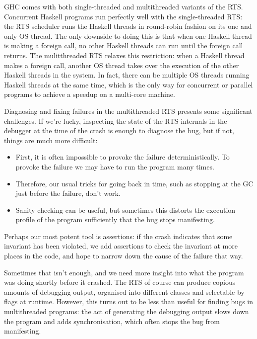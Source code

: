 \documentclass{article}
\begin{document}
GHC comes with both single-threaded and multithreaded variants of the
RTS.  Concurrent Haskell programs run perfectly well with the
single-threaded RTS: the RTS scheduler runs the Haskell threads in
round-robin fashion on its one and only OS thread.  The only downside
to doing this is that when one Haskell thread is making a foreign
call, no other Haskell threads can run until the foreign call returns.
The mulitthreaded RTS relaxes this restriction: when a Haskell thread
makes a foreign call, another OS thread takes over the execution of
the other Haskell threads in the system.  In fact, there can be
multiple OS threads running Haskell threads at the same time, which is
the only way for concurrent or parallel programs to achieve a speedup
on a multi-core machine.

Diagnosing and fixing failures in the multithreaded RTS presents
some significant challenges.  If we're lucky, inspecting the state of
the RTS internals in the debugger at the time of the crash is enough
to diagnose the bug, but if not, things are much more difficult:

\begin{itemize}
\item First, it is often impossible to provoke the failure
  deterministically.  To provoke the failure we may have to run the
  program many times.

\item Therefore, our usual tricks for going back in time, such as
  stopping at the GC just before the failure, don't work.

\item Sanity checking can be useful, but sometimes this distorts the
  execution profile of the program sufficiently that the bug stops
  manifesting.
\end{itemize}

Perhaps our most potent tool is assertions: if the crash indicates
that some invariant has been violated, we add assertions to check the
invariant at more places in the code, and hope to narrow down the
cause of the failure that way.

Sometimes that isn't enough, and we need more insight into what the
program was doing shortly before it crashed.  The RTS of course can
produce copious amounts of debugging output, organised into different
classes and selectable by flags at runtime.  However, this turns out
to be less than useful for finding bugs in multithreaded programs: the
act of generating the debugging output slows down the program and adds
synchronisation, which often stops the bug from manifesting.
\end{document}

